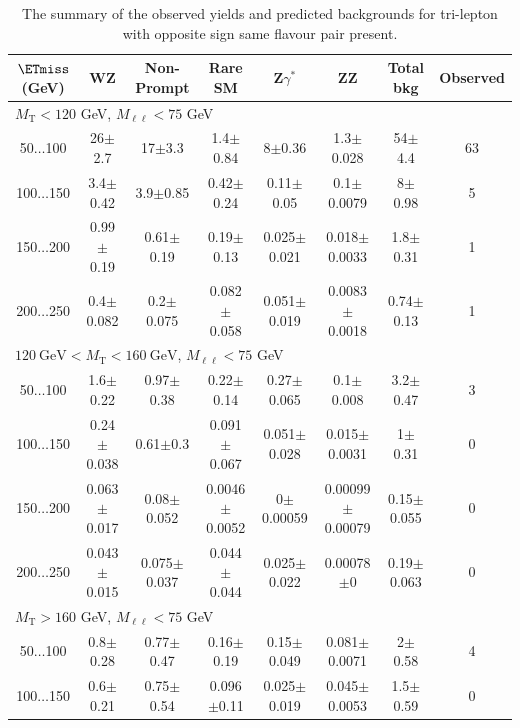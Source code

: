 \begin{landscape}
\begin{table}
\begin{center}
\caption{\label{tab:OSSF1tau0} The summary of the observed yields and predicted backgrounds for tri-lepton with opposite sign same flavour pair present. }
\begin{tabular}{| c | c c c c c c c | }\hline\hline
$\ETmiss$ (GeV) & WZ & Non-Prompt & Rare SM & Z$\gamma^*$ & ZZ & Total bkg & Observed\\\hline\hline
\multicolumn{8}{l}{$M_{\text{T}} < 120$ GeV, $M_{\ell\ell} < 75$ GeV}\\\hline\hline
50$\dots$100&26$\pm$2.7&17$\pm$3.3&1.4$\pm$0.84&8$\pm$0.36&1.3$\pm$0.028&54$\pm$4.4&63\\
100$\dots$150&3.4$\pm$0.42&3.9$\pm$0.85&0.42$\pm$0.24&0.11$\pm$0.05&0.1$\pm$0.0079&8$\pm$0.98&5\\
150$\dots$200&0.99$\pm$0.19&0.61$\pm$0.19&0.19$\pm$0.13&0.025$\pm$0.021&0.018$\pm$0.0033&1.8$\pm$0.31&1\\
200$\dots$250&0.4$\pm$0.082&0.2$\pm$0.075&0.082$\pm$0.058&0.051$\pm$0.019&0.0083$\pm$0.0018&0.74$\pm$0.13&1\\
\hline\hline
\multicolumn{8}{l}{$120~\mathrm{GeV} < M_{\text{T}} < 160~\mathrm{GeV}$, $M_{\ell\ell} < 75$ GeV}\\\hline\hline
50$\dots$100&1.6$\pm$0.22&0.97$\pm$0.38&0.22$\pm$0.14&0.27$\pm$0.065&0.1$\pm$0.008&3.2$\pm$0.47&3\\
100$\dots$150&0.24$\pm$0.038&0.61$\pm$0.3&0.091$\pm$0.067&0.051$\pm$0.028&0.015$\pm$0.0031&1$\pm$0.31&0\\
150$\dots$200&0.063$\pm$0.017&0.08$\pm$0.052&0.0046$\pm$0.0052&0$\pm$0.00059&0.00099$\pm$0.00079&0.15$\pm$0.055&0\\
200$\dots$250&0.043$\pm$0.015&0.075$\pm$0.037&0.044$\pm$0.044&0.025$\pm$0.022&0.00078$\pm$0&0.19$\pm$0.063&0\\
\hline\hline
\multicolumn{8}{l}{$M_{\text{T}} > 160$ GeV, $M_{\ell\ell} < 75$ GeV}\\\hline\hline
50$\dots$100&0.8$\pm$0.28&0.77$\pm$0.47&0.16$\pm$0.19&0.15$\pm$0.049&0.081$\pm$0.0071&2$\pm$0.58&4\\
100$\dots$150&0.6$\pm$0.21&0.75$\pm$0.54&0.096$\pm$0.11&0.025$\pm$0.019&0.045$\pm$0.0053&1.5$\pm$0.59&0\\

\end{tabular}
\end{center}
\end{table}
\end{landscape}
